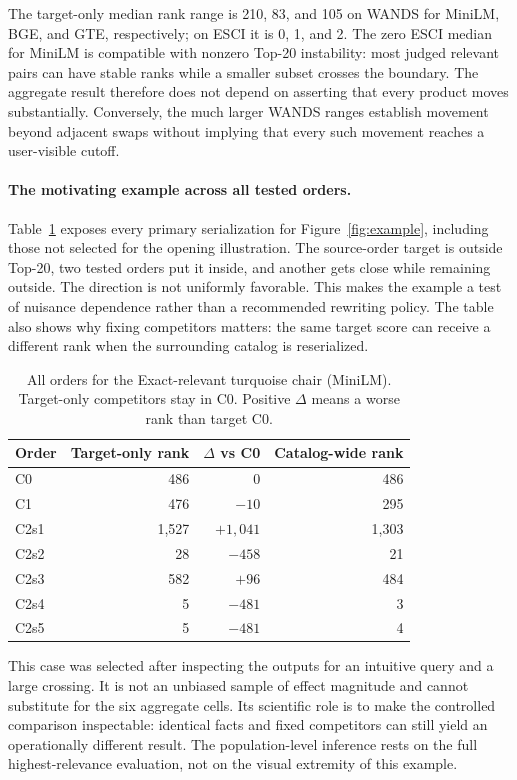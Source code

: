 The target-only median rank range is 210, 83, and 105 on WANDS for MiniLM, BGE, and GTE, respectively; on ESCI it is 0, 1, and 2. The zero ESCI median for MiniLM is compatible with nonzero Top-20 instability: most judged relevant pairs can have stable ranks while a smaller subset crosses the boundary. The aggregate result therefore does not depend on asserting that every product moves substantially. Conversely, the much larger WANDS ranges establish movement beyond adjacent swaps without implying that every such movement reaches a user-visible cutoff.

\paragraph{The motivating example across all tested orders.}
Table~\ref{tab:caseorders} exposes every primary serialization for Figure~\ref{fig:example}, including those not selected for the opening illustration. The source-order target is outside Top-20, two tested orders put it inside, and another gets close while remaining outside. The direction is not uniformly favorable. This makes the example a test of nuisance dependence rather than a recommended rewriting policy. The table also shows why fixing competitors matters: the same target score can receive a different rank when the surrounding catalog is reserialized.

\begin{table}[t]
\caption{All orders for the Exact-relevant turquoise chair (MiniLM). Target-only competitors stay in C0. Positive $\Delta$ means a worse rank than target C0.}
\label{tab:caseorders}\centering\small
\begin{tabular}{lrrr}\toprule
Order & Target-only rank & $\Delta$ vs C0 & Catalog-wide rank\\\midrule
C0 & 486 & 0 & 486\\
C1 & 476 & $-10$ & 295\\
C2s1 & 1,527 & $+1,041$ & 1,303\\
C2s2 & 28 & $-458$ & 21\\
C2s3 & 582 & $+96$ & 484\\
C2s4 & 5 & $-481$ & 3\\
C2s5 & 5 & $-481$ & 4\\\bottomrule
\end{tabular}
\end{table}

This case was selected after inspecting the outputs for an intuitive query and a large crossing. It is not an unbiased sample of effect magnitude and cannot substitute for the six aggregate cells. Its scientific role is to make the controlled comparison inspectable: identical facts and fixed competitors can still yield an operationally different result. The population-level inference rests on the full highest-relevance evaluation, not on the visual extremity of this example.

